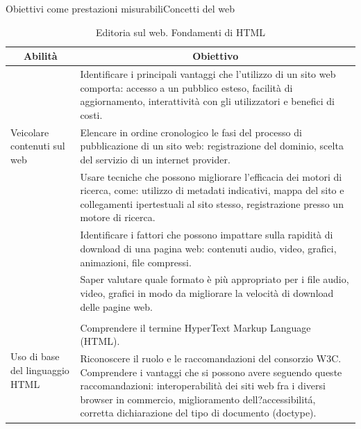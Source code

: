 \documentclass[italian]{beamer}
\begin{document}
\begin{frame}[allowframebreaks]{Obiettivi come prestazioni misurabili}{Concetti del web}
	\framebreak
	
	{\tiny
		\begin{table}
			\begin{tabular}{@{}p{}p{}@{}} \toprule
				\multicolumn{1}{c}{Abilit\`a} & \multicolumn{1}{c}{Obiettivo} \\ \midrule
				
				\multirow{3}{*}{\parbox{0.2\textwidth}{Veicolare contenuti sul web}}
				& Identificare i principali vantaggi che l'utilizzo di un	sito web comporta: accesso a un pubblico esteso, facilit\`a di aggiornamento, interattivit\`a con gli utilizzatori e benefici di costi.\\
				
				& Elencare in ordine cronologico le fasi del processo di pubblicazione di un sito web: registrazione del dominio, scelta del servizio di un internet provider.\\
				
				& Usare tecniche che possono migliorare l'efficacia dei motori di ricerca, come: utilizzo di
				metadati indicativi, mappa del sito e collegamenti ipertestuali al sito stesso, registrazione presso un motore di ricerca.\\
				
				& Identificare i fattori che possono impattare sulla rapidit\`a di download di una pagina web: contenuti audio, video, grafici, animazioni, file compressi.\\
				
				& Saper valutare quale formato \`e pi\`u appropriato per i file audio, video, grafici in modo da migliorare la velocit\`a di download delle pagine web.\\
				
				\\
				
				\multirow{3}{*}{\parbox{0.2\textwidth}{Uso di base del linguaggio HTML}}
				& Comprendere il termine HyperText Markup Language (HTML).\\
				& Riconoscere il ruolo e le raccomandazioni del consorzio W3C. Comprendere i vantaggi che si
				possono avere seguendo queste raccomandazioni: interoperabilit\`a dei siti web fra i diversi browser in commercio, miglioramento dell?accessibilit\'a, corretta dichiarazione del tipo di documento (doctype).\\
			\end{tabular}
			\caption{Editoria sul web. Fondamenti di HTML}
		\end{table}
	}
	

\end{frame}
\end{document}
